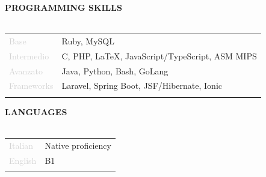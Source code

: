 \documentclass{article}
\begin{document}
\textbf{\textcolor{deepblue}{PROGRAMMING SKILLS}} \\\\ \hfill
\begin{tabular}{ R{4cm} l }
	\textcolor{lightgray}{Base}       & Ruby, MySQL                                    \\ \hfill
	\textcolor{lightgray}{Intermedio} & C, PHP, LaTeX, JavaScript/TypeScript, ASM MIPS \\ \hfill
	\textcolor{lightgray}{Avanzato}   & Java, Python, Bash, GoLang                     \\[.5cm] \hfill
	\textcolor{lightgray}{Frameworks} & Laravel, Spring Boot, JSF/Hibernate, Ionic     \\ \hfill
\end{tabular}

\textbf{\textcolor{deepblue}{LANGUAGES}} \\\\ \hfill
\begin{tabular}{ R{4cm} l }
	\textcolor{lightgray}{Italian} & Native proficiency \\ \hfill
	\textcolor{lightgray}{English} & B1                 \\ \hfill
\end{tabular}
\end{document}
